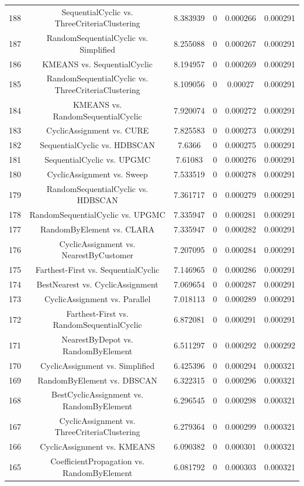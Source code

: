 \documentclass[a4paper,10pt]{article}
\begin{document}
\begin{landscape}
\begin{table}[!htp]
\begin{tabular}{cccccc}
188&SequentialCyclic vs. ThreeCriteriaClustering&8.383939&0&0.000266&0.000291\\
187&RandomSequentialCyclic vs. Simplified&8.255088&0&0.000267&0.000291\\
186&KMEANS vs. SequentialCyclic&8.194957&0&0.000269&0.000291\\
185&RandomSequentialCyclic vs. ThreeCriteriaClustering&8.109056&0&0.00027&0.000291\\
184&KMEANS vs. RandomSequentialCyclic&7.920074&0&0.000272&0.000291\\
183&CyclicAssignment vs. CURE&7.825583&0&0.000273&0.000291\\
182&SequentialCyclic vs. HDBSCAN&7.6366&0&0.000275&0.000291\\
181&SequentialCyclic vs. UPGMC&7.61083&0&0.000276&0.000291\\
180&CyclicAssignment vs. Sweep&7.533519&0&0.000278&0.000291\\
179&RandomSequentialCyclic vs. HDBSCAN&7.361717&0&0.000279&0.000291\\
178&RandomSequentialCyclic vs. UPGMC&7.335947&0&0.000281&0.000291\\
177&RandomByElement vs. CLARA&7.335947&0&0.000282&0.000291\\
176&CyclicAssignment vs. NearestByCustomer&7.207095&0&0.000284&0.000291\\
175&Farthest-First vs. SequentialCyclic&7.146965&0&0.000286&0.000291\\
174&BestNearest vs. CyclicAssignment&7.069654&0&0.000287&0.000291\\
173&CyclicAssignment vs. Parallel&7.018113&0&0.000289&0.000291\\
172&Farthest-First vs. RandomSequentialCyclic&6.872081&0&0.000291&0.000291\\
171&NearestByDepot vs. RandomByElement&6.511297&0&0.000292&0.000292\\
170&CyclicAssignment vs. Simplified&6.425396&0&0.000294&0.000321\\
169&RandomByElement vs. DBSCAN&6.322315&0&0.000296&0.000321\\
168&BestCyclicAssignment vs. RandomByElement&6.296545&0&0.000298&0.000321\\
167&CyclicAssignment vs. ThreeCriteriaClustering&6.279364&0&0.000299&0.000321\\
166&CyclicAssignment vs. KMEANS&6.090382&0&0.000301&0.000321\\
165&CoefficientPropagation vs. RandomByElement&6.081792&0&0.000303&0.000321\\

\end{tabular}
\end{table}
\end{landscape}
\end{document}
